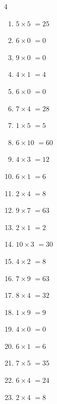\begin{multicols}{4}
\begin{enumerate}
  \item $5\times 5$
        $=25$

  \item $6\times 0$
        $=0$

  \item $9\times 0$
        $=0$

  \item $4\times 1$
        $=4$

  \item $6\times 0$
        $=0$

  \item $7\times 4$
        $=28$

  \item $1\times 5$
        $=5$

  \item $6\times 10$
        $=60$

  \item $4\times 3$
        $=12$

  \item $6\times 1$
        $=6$

  \item $2\times 4$
        $=8$

  \item $9\times 7$
        $=63$

  \item $2\times 1$
        $=2$

  \item $10\times 3$
        $=30$

  \item $4\times 2$
        $=8$

  \item $7\times 9$
        $=63$

  \item $8\times 4$
        $=32$

  \item $1\times 9$
        $=9$

\columnbreak %

  \item $4\times 0$
        $=0$

  \item $6\times 1$
        $=6$

  \item $7\times 5$
        $=35$

  \item $6\times 4$
        $=24$

  \item $2\times 4$
        $=8$


\end{enumerate}
\end{multicols}

